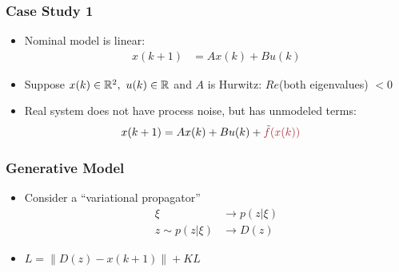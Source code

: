 \documentclass[aspectratio=169,handout]{beamer} 	%
\begin{document}
\begin{frame}
	\frametitle{Case Study 1}
	\begin{itemize}[<+->]
		\itemsep \baselineskip
		
		\item Nominal model is linear:
		\begin{align*}
			x(k + 1) &= A x(k) + B u(k)
		\end{align*}
		
		\item Suppose $x(k) \in \real[2], ~u(k) \in \real$ and $A$ is Hurwitz: 
		$Re$(both eigenvalues) $< 0$
		
		\item Real system does not have process noise, but has unmodeled terms:
		\begin{align*}
			x(k + 1) &= A x(k) + B u(k) + \mathalert{\tilde{f}(x(k))}
		\end{align*}
		
		
	\end{itemize}
	
\end{frame}










\begin{frame}
	\frametitle{Generative Model}
	\begin{itemize}[<+->]
		\itemsep \baselineskip
		
		\item Consider a ``variational propagator''
		\begin{align*}
			\xi &\rightarrow p(z | \xi) \\
			z \sim p(z | \xi) &\rightarrow D(z)
		\end{align*}
		
		\item $L = \| D(z) - x(k + 1) \| + KL$
		
	\end{itemize}

\end{frame}
\end{document}
